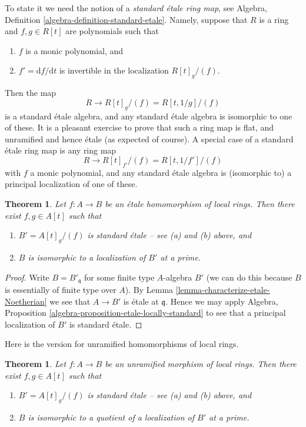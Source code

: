 \documentclass{stacks-project}
\theoremstyle{plain}
\newtheorem{theorem}[subsection]{Theorem}
\theoremstyle{definition}
\theoremstyle{remark}
\numberwithin{equation}{subsection}
\begin{document}
\medskip\noindent
To state it we need the notion of a {\it standard \'etale ring map}, see
Algebra, Definition \ref{algebra-definition-standard-etale}.
Namely, suppose that $R$ is a ring and $f, g \in R[t]$ are polynomials
such that
\begin{enumerate}
\item[(a)] $f$ is a monic polynomial, and
\item[(b)] $f' = \text{d}f/\text{d}t$ is invertible in the localization
$R[t]_g/(f)$.
\end{enumerate}
Then the map
$$
R \longrightarrow R[t]_g/(f) = R[t, 1/g]/(f)
$$
is a standard \'etale algebra, and any standard \'etale algebra is isomorphic
to one of these. It is a pleasant exercise to prove that such a ring map
is flat, and unramified and hence \'etale (as expected of course).
A special case of a standard \'etale ring map is any ring map
$$
R \longrightarrow R[t]_{f'}/(f) = R[t, 1/f']/(f)
$$
with $f$ a monic polynomial, and any standard \'etale algebra is (isomorphic to)
a principal localization of one of these.

\begin{theorem}
\label{theorem-structure-etale}
Let $f : A \to B$ be an \'etale homomorphism of local rings.
Then there exist $f, g \in A[t]$ such that
\begin{enumerate}
\item $B' = A[t]_g/(f)$ is standard \'etale -- see (a) and (b) above, and
\item $B$ is isomorphic to a localization of $B'$ at a prime.
\end{enumerate}
\end{theorem}

\begin{proof}
Write $B = B'_{\mathfrak q}$ for some finite type $A$-algebra $B'$
(we can do this because $B$ is essentially of finite type over $A$).
By Lemma \ref{lemma-characterize-etale-Noetherian}
we see that $A \to B'$ is \'etale at $\mathfrak q$.
Hence we may apply
Algebra, Proposition \ref{algebra-proposition-etale-locally-standard}
to see that a principal localization of $B'$ is standard \'etale.
\end{proof}

\noindent
Here is the version for unramified homomorphisms of local rings.

\begin{theorem}
\label{theorem-structure-unramified}
Let $f : A \to B$ be an unramified morphism of local rings.
Then there exist $f, g \in A[t]$ such that
\begin{enumerate}
\item $B' = A[t]_g/(f)$ is standard \'etale -- see (a) and (b) above, and
\item $B$ is isomorphic to a quotient of a localization of $B'$ at a prime.
\end{enumerate}
\end{theorem}
\end{document}

